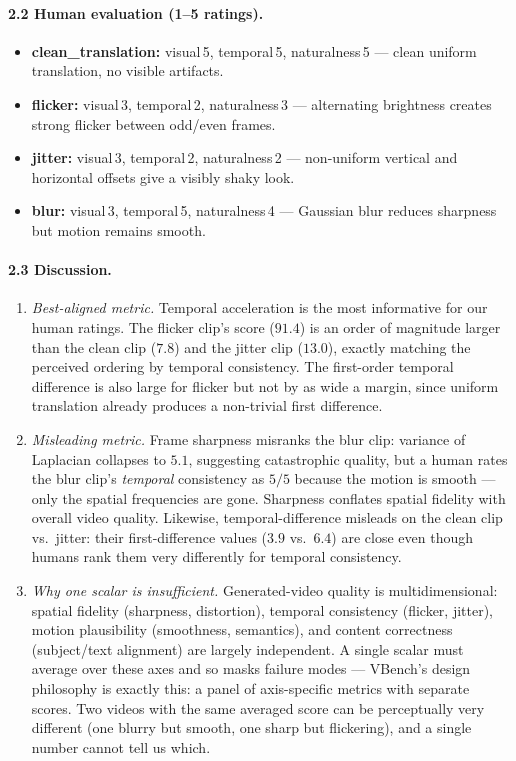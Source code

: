 \documentclass[10pt,a4paper]{article}
\begin{document}
\paragraph{2.2 Human evaluation (1--5 ratings).}
\begin{itemize}[nosep]
    \item \textbf{clean\_translation:} visual\,5, temporal\,5, naturalness\,5 --- clean uniform translation, no visible artifacts.
    \item \textbf{flicker:} visual\,3, temporal\,2, naturalness\,3 --- alternating brightness creates strong flicker between odd/even frames.
    \item \textbf{jitter:} visual\,3, temporal\,2, naturalness\,2 --- non-uniform vertical and horizontal offsets give a visibly shaky look.
    \item \textbf{blur:} visual\,3, temporal\,5, naturalness\,4 --- Gaussian blur reduces sharpness but motion remains smooth.
\end{itemize}

\paragraph{2.3 Discussion.}
\begin{enumerate}[leftmargin=*,itemsep=0pt]
    \item \emph{Best-aligned metric.} Temporal acceleration is the most informative for our human ratings. The flicker clip's score ($91.4$) is an order of magnitude larger than the clean clip ($7.8$) and the jitter clip ($13.0$), exactly matching the perceived ordering by temporal consistency. The first-order temporal difference is also large for flicker but not by as wide a margin, since uniform translation already produces a non-trivial first difference.
    \item \emph{Misleading metric.} Frame sharpness misranks the blur clip: variance of Laplacian collapses to $5.1$, suggesting catastrophic quality, but a human rates the blur clip's \emph{temporal} consistency as $5/5$ because the motion is smooth --- only the spatial frequencies are gone. Sharpness conflates spatial fidelity with overall video quality. Likewise, temporal-difference misleads on the clean clip vs.\ jitter: their first-difference values ($3.9$ vs.\ $6.4$) are close even though humans rank them very differently for temporal consistency.
    \item \emph{Why one scalar is insufficient.} Generated-video quality is multidimensional: spatial fidelity (sharpness, distortion), temporal consistency (flicker, jitter), motion plausibility (smoothness, semantics), and content correctness (subject/text alignment) are largely independent. A single scalar must average over these axes and so masks failure modes --- VBench's design philosophy is exactly this: a panel of axis-specific metrics with separate scores. Two videos with the same averaged score can be perceptually very different (one blurry but smooth, one sharp but flickering), and a single number cannot tell us which.
\end{enumerate}
\end{document}
